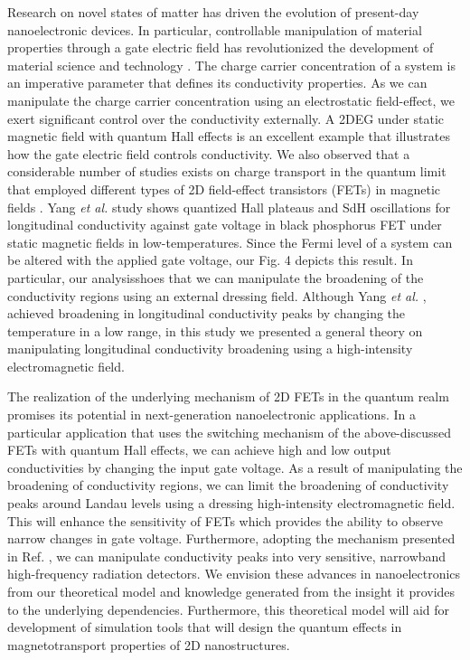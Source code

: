 \documentclass{article}
\begin{document}
\begin{itemize}
{  Research on novel states of matter has driven the evolution of present-day nanoelectronic devices. In particular, controllable manipulation of material properties through a gate electric field has revolutionized the development of material science and technology \cite{ahn03,deng18}.
  The charge carrier concentration of a system is an imperative parameter that defines its conductivity properties.
  As we can manipulate the charge carrier concentration using an electrostatic field-effect, we exert significant control over the conductivity externally.
  A 2DEG under static magnetic field with quantum Hall effects is an excellent example that illustrates how the gate electric field controls conductivity.
  We also observed that a considerable number of studies exists on charge transport in the quantum limit that employed different types of 2D field-effect transistors (FETs) in magnetic fields \cite{wakabayashi78,yang18,long20,li14}. Yang \textit{et al.} \cite{yang18} study shows quantized Hall plateaus and SdH oscillations for longitudinal conductivity against gate voltage in black phosphorus FET under static magnetic fields in low-temperatures. Since the Fermi level of a system can be altered with the applied gate voltage, our Fig. 4 depicts this result.
  In particular, our analysisshoes that we can manipulate the broadening of the conductivity regions using an external dressing field. Although Yang \textit{et al.} \cite{yang18}, achieved broadening in longitudinal conductivity peaks by changing the temperature in a low range, in this study we presented a general theory on manipulating longitudinal conductivity broadening using a high-intensity electromagnetic field.

  The realization of the underlying mechanism of 2D FETs in the quantum realm promises its potential in next-generation nanoelectronic applications. In a particular application that uses the switching mechanism of the above-discussed FETs with quantum Hall effects, we can achieve high and low output conductivities by changing the input gate voltage. As a result of manipulating the broadening of conductivity regions, we can limit the broadening of conductivity peaks around Landau levels using a dressing high-intensity electromagnetic field. This will enhance the sensitivity of FETs which provides the ability to observe narrow changes in gate voltage.
  Furthermore, adopting the mechanism presented in Ref. \cite{hirakawa01}, we can manipulate conductivity peaks into very sensitive, narrowband high-frequency radiation detectors.
  We envision these advances in nanoelectronics from our theoretical model and knowledge generated from the insight it provides to the underlying dependencies.
  Furthermore, this theoretical model will aid for development of simulation tools that will design the quantum effects in magnetotransport properties of 2D nanostructures.
  }
\end{itemize}
\end{document}
